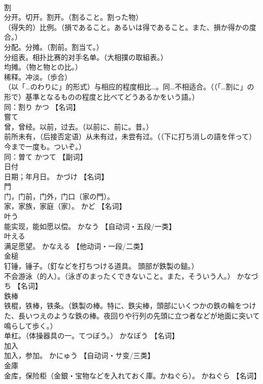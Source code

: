 \documentclass[8pt]{extreport}
\begin{document}
\begin{CJK}{UTF8}{min}
\\	割	
\\	分开。切开。割开。（割ること。割った物） 
\\	（得失的）比例。（損であること。あるいは得であること。また、損か得かの度合。） 
\\	分配。分摊。（割前。割当て。） 
\\	分组表。相扑比赛的对手名单。（大相撲の取組表。） 
\\	均摊。（物と物との比。） 
\\	稀释。冲淡。（歩合） 
\\	（以「…のわりに」的形式）与相应的程度相比…。同…不相适合。（（「…割に」の形で）基準となるものの程度と比べてどうあるかをいう語。） 
\\	同：割り	かつ		【名词】
\\	嘗て	
\\	曾，曾经。以前，过去。（以前に、前に。昔。） 
\\	前所未有，（后接否定语）从未有过，未尝有过。（（下に打ち消しの語を伴って）今まで一度も。ついぞ。） 
\\	同：曽て	かつて		【副词】
\\	日付	
\\	日期；年月日。	かづけ		【名词】
\\	門	
\\	门，门前，门外，门口（家の門）。 
\\	家，家族，家庭（家）。	かど		【名词】
\\	叶う	
\\	能实现，能如愿以偿。	かなう		【自动词・五段/一类】
\\	叶える	
\\	满足愿望。	かなえる		【他动词・一段/二类】
\\	金槌	
\\	钉锤，锤子。（釘などを打ちつける道具。 頭部が鉄製の鎚。） 
\\	不会游泳（的人）。（泳ぎのまったくできないこと。また，そういう人。）	かなづち		【名词】
\\	鉄棒	
\\	铁棍，铁棒，铁条。（鉄製の棒。特に、鉄尖棒，頭部にいくつかの鉄の輪をつけた、長いつえのような鉄の棒。夜回りや行列の先頭に立つ者などが地面に突いて鳴らして歩く。） 
\\	单杠。（体操器具の一。てつぼう。）	かなぼう		【名词】
\\	加入	
\\	加入，参加。	かにゅう		【自动词・サ变/三类】
\\	金庫	
\\	金库，保险柜（金銀・宝物などを入れておく庫。かねぐら）。	かねぐら		【名词】

\end{CJK}
\end{document}
